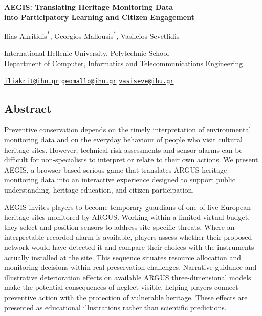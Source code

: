 \documentclass[11pt,a4paper]{article}
\begin{document}
\begin{center}
{\Large\bfseries AEGIS: Translating Heritage Monitoring Data\\
into Participatory Learning and Citizen Engagement\par}
\vspace{0.3em}
{\normalsize Ilias Akritidis\textsuperscript{*},
Georgios Mallousis\textsuperscript{*},
Vasileios Sevetlidis\par}
\vspace{0.1em}
{\small International Hellenic University, Polytechnic School\\
Department of Computer, Informatics and Telecommunications Engineering\par}
\vspace{0.0em}
{\small\href{mailto:iliakrit@ihu.gr}{\texttt{iliakrit@ihu.gr}}\quad
\href{mailto:geomallo@ihu.gr}{\texttt{geomallo@ihu.gr}}\quad
\href{mailto:vasiseve@ihu.gr}{\texttt{vasiseve@ihu.gr}}\par}
\end{center}
{\renewcommand{\thefootnote}{\fnsymbol{footnote}}%
}
\subsection*{Abstract}
Preventive conservation depends on the timely interpretation of environmental monitoring data and on the everyday behaviour of people who visit cultural heritage sites. However, technical risk assessments and sensor alarms can be difficult for non-specialists to interpret or relate to their own actions. We present AEGIS, a browser-based serious game that translates ARGUS heritage monitoring data into an interactive experience designed to support public understanding, heritage education, and citizen participation.

AEGIS invites players to become temporary guardians of one of five European heritage sites monitored by ARGUS. Working within a limited virtual budget, they select and position sensors to address site-specific threats. Where an interpretable recorded alarm is available, players assess whether their proposed network would have detected it and compare their choices with the instruments actually installed at the site. This sequence situates resource allocation and monitoring decisions within real preservation challenges. Narrative guidance and illustrative deterioration effects on available ARGUS three-dimensional models make the potential consequences of neglect visible, helping players connect preventive action with the protection of vulnerable heritage. These effects are presented as educational illustrations rather than scientific predictions.
\end{document}
